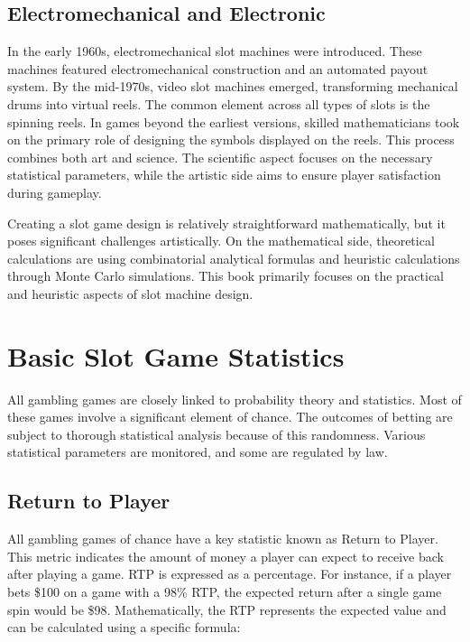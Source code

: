 \documentclass[12pt,twoside,openany]{book}
\begin{document}
\section*{Electromechanical and Electronic}

In the early 1960s, electromechanical slot machines were introduced. These machines featured electromechanical construction and an automated payout system. By the mid-1970s, video slot machines emerged, transforming mechanical drums into virtual reels. The common element across all types of slots is the spinning reels. In games beyond the earliest versions, skilled mathematicians took on the primary role of designing the symbols displayed on the reels. This process combines both art and science. The scientific aspect focuses on the necessary statistical parameters, while the artistic side aims to ensure player satisfaction during gameplay.

Creating a slot game design is relatively straightforward mathematically, but it poses significant challenges artistically. On the mathematical side, theoretical calculations are using combinatorial analytical formulas and heuristic calculations through Monte Carlo simulations. This book primarily focuses on the practical and heuristic aspects of slot machine design.

\chapter{Basic Slot Game Statistics}

All gambling games are closely linked to probability theory and statistics. Most of these games involve a significant element of chance. The outcomes of betting are subject to thorough statistical analysis because of this randomness. Various statistical parameters are monitored, and some are regulated by law.

\section*{Return to Player}

All gambling games of chance have a key statistic known as Return to Player. This metric indicates the amount of money a player can expect to receive back after playing a game. RTP is expressed as a percentage. For instance, if a player bets \$100 on a game with a 98\% RTP, the expected return after a single game spin would be \$98. Mathematically, the RTP represents the expected value and can be calculated using a specific formula:
\end{document}
